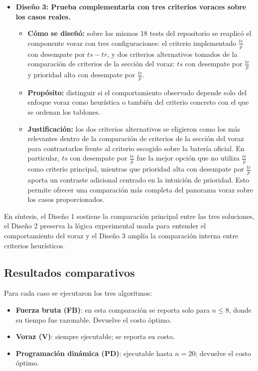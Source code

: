 \documentclass[12pt,a4paper]{article}
\begin{document}
\begin{itemize}
  \item \textbf{Dise\~no 3: Prueba complementaria con tres criterios voraces sobre los casos reales.}
  \begin{itemize}
    \item \textbf{C\'omo se dise\~n\'o:} sobre los mismos 18 tests del repositorio se reaplic\'o el componente voraz con tres configuraciones: el criterio implementado \(\frac{tr}{p}\) con desempate por \(ts-tr\), y dos criterios alternativos tomados de la comparaci\'on de criterios de la secci\'on del voraz: \(ts\) con desempate por \(\frac{tr}{p}\) y prioridad alta con desempate por \(\frac{tr}{p}\).
    \item \textbf{Prop\'osito:} distinguir si el comportamiento observado depende solo del enfoque voraz como heur\'istica o tambi\'en del criterio concreto con el que se ordenan los tablones.
    \item \textbf{Justificaci\'on:} los dos criterios alternativos se eligieron como los m\'as relevantes dentro de la comparaci\'on de criterios de la secci\'on del voraz para contrastarlos frente al criterio escogido sobre la bater\'ia oficial. En particular, \(ts\) con desempate por \(\frac{tr}{p}\) fue la mejor opci\'on que no utiliza \(\frac{tr}{p}\) como criterio principal, mientras que prioridad alta con desempate por \(\frac{tr}{p}\) aporta un contraste adicional centrado en la intuici\'on de prioridad. Esto permite ofrecer una comparaci\'on m\'as completa del panorama voraz sobre los casos proporcionados.
  \end{itemize}
\end{itemize}

En s\'intesis, el Dise\~no 1 sostiene la comparaci\'on principal entre las tres soluciones, el Dise\~no 2 preserva la l\'ogica experimental usada para entender el comportamiento del voraz y el Dise\~no 3 ampl\'ia la comparaci\'on interna entre criterios heur\'isticos.

\subsection{Resultados comparativos}

Para cada caso se ejecutaron los tres algoritmos:
\begin{itemize}
  \item \textbf{Fuerza bruta (FB)}: en esta comparaci\'on se reporta solo para \(n \leq 8\), donde su tiempo fue razonable. Devuelve el costo \'optimo.
  \item \textbf{Voraz (V)}: siempre ejecutable; se reporta su costo.
  \item \textbf{Programaci\'on din\'amica (PD)}: ejecutable hasta \(n=20\); devuelve el costo \'optimo.
\end{itemize}
\end{document}
